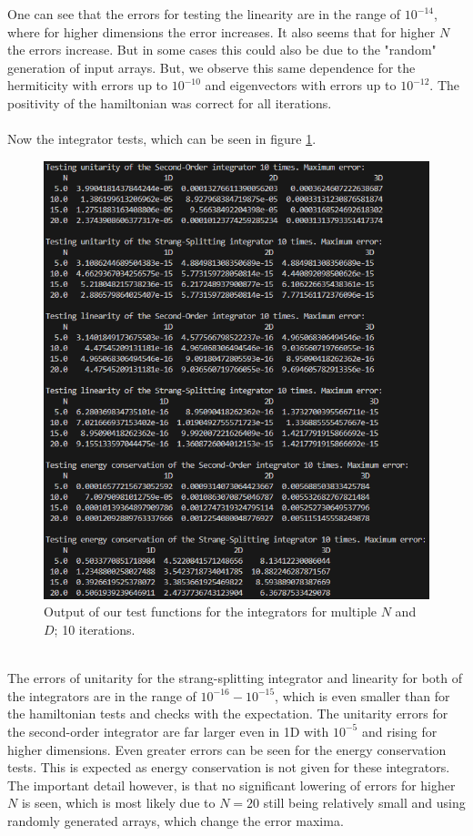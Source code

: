 \documentclass[11pt, letterpaper, onecolumn]{article}
\begin{document}
    \noindent
	One can see that the errors for testing the linearity are in the range of $10^{-14}$, where for higher dimensions the error increases. It also seems that for higher $N$ the errors increase. But in some cases this could also be due to the "random" generation of input arrays. But, we observe this same dependence for the hermiticity with errors up to $10^{-10}$ and eigenvectors with errors up to $10^{-12}$. The positivity of the hamiltonian was correct for all iterations.
    \newpage
        \\
	\\
	Now the integrator tests, which can be seen in figure \ref{fig:test-integrators}. 
	\begin{figure} [H] 
	\begin{center}
	\includegraphics[width=13cm]{"test_integrators2.png"}
	\caption{Output of our test functions for the integrators for multiple $N$ and $D$; 10 iterations.} \label{fig:test-integrators}
	\end{center}
	\end{figure}
	\\
	The errors of unitarity for the strang-splitting integrator and linearity for both of the integrators are in the range of $10^{-16}-10^{-15}$, which is even smaller than for the hamiltonian tests and checks with the expectation. The unitarity errors for the second-order integrator are far larger even in 1D with $10^{-5}$ and rising for higher dimensions. Even greater errors can be seen for the energy conservation tests. This is expected as energy conservation is not given for these integrators. The important detail however, is that no significant lowering of errors for higher $N$ is seen, which is most likely due to $N=20$ still being relatively small and using randomly generated arrays, which change the error maxima.
\end{document}
